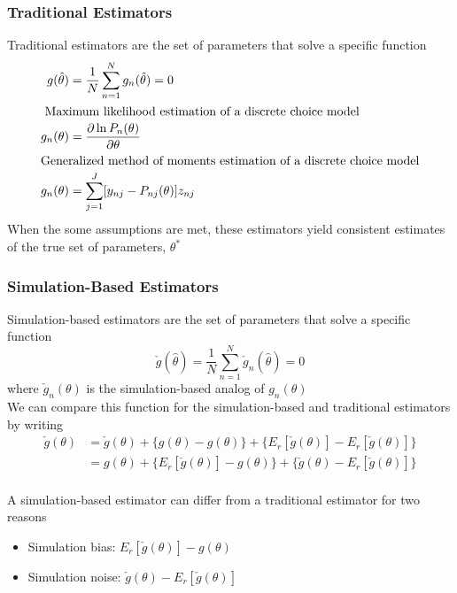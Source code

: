 \documentclass{beamer}
\begin{document}
\begin{frame}\frametitle{Traditional Estimators}
    Traditional estimators are the set of parameters that solve a specific function
    \begin{align*}
        g(\hat{\theta}) &= \frac{1}{N} \sum_{n = 1}^N g_n(\hat{\theta}) = 0 \\
        \intertext{ Maximum likelihood estimation of a discrete choice model}
        g_n(\theta) &= \frac{\partial \ln P_n(\theta)}{\partial \theta} \\
        \intertext{Generalized method of moments estimation of a discrete choice model}
        g_n(\theta) &= \sum_{j = 1}^J [y_{nj} - P_{nj}(\theta)] z_{nj}
    \end{align*}
    When the some assumptions are met, these estimators yield consistent estimates of the true set of parameters, $\theta^*$
\end{frame}

\begin{frame}\frametitle{Simulation-Based Estimators}
     Simulation-based estimators are the set of parameters that solve a specific function
     $$\check{g}(\hat{\theta}) = \frac{1}{N} \sum_{n = 1}^N \check{g}_n(\hat{\theta}) = 0$$
     where $\check{g}_n(\theta)$ is the simulation-based analog of $g_n(\theta)$ \\
     \vspace{2ex}
     We can compare this function for the simulation-based and traditional estimators by writing
     \begin{align*}
        \check{g}(\theta) &= \check{g}(\theta) + \{ g(\theta) - g(\theta) \} + \{ E_r[\check{g}(\theta)] - E_r[\check{g}(\theta)] \} \\
        &= g(\theta) + \{ E_r[\check{g}(\theta)] - g(\theta) \} + \{ \check{g}(\theta) - E_r[\check{g}(\theta)] \}
     \end{align*} \\
     \vspace{2ex}
     A simulation-based estimator can differ from a traditional estimator for two reasons
     \begin{itemize}
         \item Simulation bias: $E_r[\check{g}(\theta)] - g(\theta)$
         \item Simulation noise: $\check{g}(\theta) - E_r[\check{g}(\theta)]$
     \end{itemize}
\end{frame}
\end{document}
